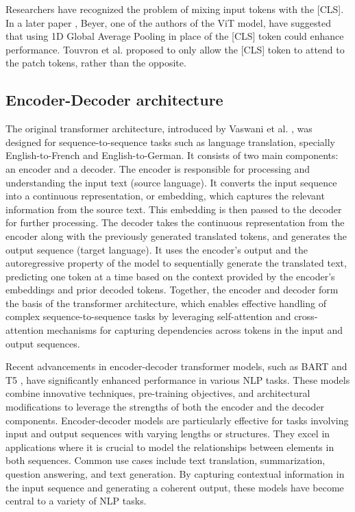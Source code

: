 \documentclass[anon,12pt]{colt2024} %
\begin{document}
Researchers have recognized the problem of mixing input tokens with the [CLS]. In a later paper \cite{beyer2022better}, Beyer, one of the authors of the ViT model, have suggested that using 1D Global Average Pooling in place of the [CLS] token could enhance performance.
Touvron et al. \cite{touvron2021going} proposed to only allow the [CLS] token to attend to the patch tokens, rather than the opposite.

\subsection{Encoder-Decoder architecture}
The original transformer architecture, introduced by Vaswani et al. \cite{vaswani2017attention}, was designed for sequence-to-sequence tasks such as language translation, specially English-to-French and English-to-German.
It consists of two main components: an encoder and a decoder.
The encoder is responsible for processing and understanding the input text (source language). It converts the input sequence into a continuous representation, or embedding, which captures the relevant information from the source text. This embedding is then passed to the decoder for further processing.
The decoder takes the continuous representation from the encoder along with the previously generated translated tokens, and generates the output sequence (target language). It uses the encoder's output and the autoregressive property of the model to sequentially generate the translated text, predicting one token at a time based on the context provided by the encoder's embeddings and prior decoded tokens.
Together, the encoder and decoder form the basis of the transformer architecture, which enables effective handling of complex sequence-to-sequence tasks by leveraging self-attention and cross-attention mechanisms for capturing dependencies across tokens in the input and output sequences.

Recent advancements in encoder-decoder transformer models, such as BART \cite{lewis2020bart} and T5 \cite{raffel2020exploring,tay2023ul}, have significantly enhanced performance in various NLP tasks. These models combine innovative techniques, pre-training objectives, and architectural modifications to leverage the strengths of both the encoder and the decoder components.
Encoder-decoder models are particularly effective for tasks involving input and output sequences with varying lengths or structures. They excel in applications where it is crucial to model the relationships between elements in both sequences. Common use cases include text translation, summarization, question answering, and text generation. By capturing contextual information in the input sequence and generating a coherent output, these models have become central to a variety of NLP tasks.
\end{document}
